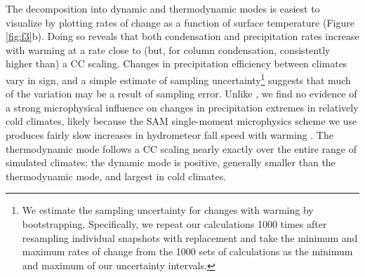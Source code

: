 \documentclass[twocol]{ametsoc}
\begin{document}
The decomposition into dynamic and thermodynamic modes is easiest to visualize by plotting rates of change as a function of surface temperature (Figure \ref{fig:f3}b). Doing so reveals that both condensation and precipitation rates increase with warming at a rate close to (but, for column condensation, consistently higher than) a CC scaling. Changes in precipitation efficiency between climates vary in sign, and a simple estimate of sampling uncertainty\footnote{We estimate the sampling uncertainty for changes with warming by bootstrapping. Specifically, we repeat our calculations 1000 times after resampling individual snapshots with replacement and take the minimum and maximum rates of change from the 1000 sets of calculations as the minimum and maximum of our uncertainty intervals.} suggests that much of the variation may be a result of sampling error. Unlike \citet{Singh2014TheTemperature}, we find no evidence of a strong microphysical influence on changes in precipitation extremes in relatively cold climates, likely because the SAM single-moment microphysics scheme we use \citep{Khairoutdinov2003CloudSensitivities} produces fairly slow increases in hydrometeor fall speed with warming \citep{Lutsko2018IncreaseEquilibrium}. The thermodynamic mode follows a CC scaling nearly exactly over the entire range of simulated climates; the dynamic mode is positive, generally smaller than the thermodynamic mode, and largest in cold climates.
\end{document}
